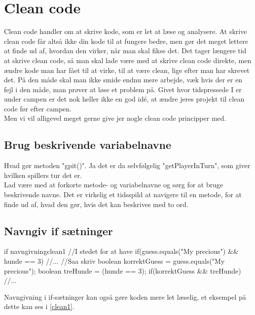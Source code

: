 \chapter{Clean code}

Clean code handler om at skrive kode, som er let at læse og analysere. At skrive clean code får altså ikke din kode til at fungere bedre, men gør det meget lettere at finde ud af, hvordan den virker, når man skal fikse det. Det tager længere tid at skrive clean code, så man skal lade være med at skrive clean code direkte, men ændre kode man har fået til at virke, til at være clean, lige efter man har skrevet det. På den måde skal man ikke smide endnu mere arbejde, væk hvis der er en fejl i den måde, man prøver at løse et problem på. Givet hvor tidspressede I er under campen er det nok heller ikke en god idé, at ændre jeres projekt til clean code før efter campen. \\
Men vi vil alligevel meget gerne give jer nogle clean code principper med. 

\section{Brug beskrivende variabelnavne}
Hvad gør metoden "gpit()". Ja det er da selvfølgelig "getPlayerInTurn", som giver hvilken spillers tur det er. \\
Lad være med at forkorte metode- og variabelnavne og sørg for at bruge beskrivende navne. Det er virkelig et tidsspild at navigere til en metode, for at finde ud af, hvad den gør, hvis det kan beskrives med to ord.

\section{Navngiv if sætninger}
\begin{JavaCode}{if navngivning}{clean1}
	//I stedet for at have
	if(guess.equals("My precious") && hunde == 3){
		//...
	}
	//Saa skriv
	boolean korrektGuess = guess.equals("My precious");
	boolean treHunde = (hunde == 3);
	if(korrektGuess && treHunde){
		//...
	}
\end{JavaCode}
Navngivning i if-sætninger kan også gøre koden mere let læselig, et eksempel på dette kan ses i \autoref{clean1}.

